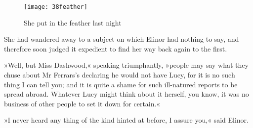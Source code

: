 \begin{letter}
	\begin{figure}[tbph]
		\centering
		\texttt{[image: 38feather]}
		\caption{She put in the feather last night}
	\end{figure}
\end{letter}


She had wandered away to a subject on which Elinor had nothing to say, and therefore soon judged it expedient to find her way back again to the first.

»Well, but Miss Dashwood,« speaking triumphantly, »people may say what they chuse about Mr Ferrars’s declaring he would not have Lucy, for it is no such thing I can tell you; and it is quite a shame for such ill-natured reports to be spread abroad. Whatever Lucy might think about it herself, you know, it was no business of other people to set it down for certain.«

»I never heard any thing of the kind hinted at before, I assure you,« said Elinor.

